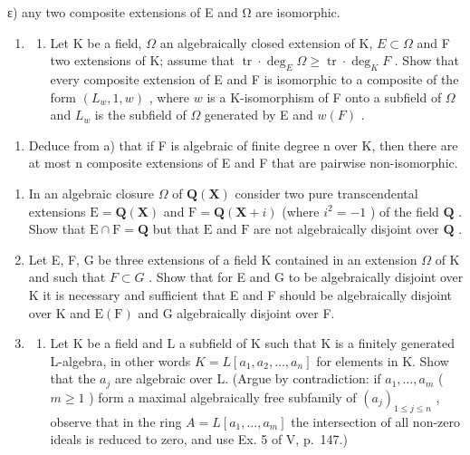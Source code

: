 ε) any two composite extensions of E and Ω are isomorphic.

\begin{enumerate}
\def\labelenumi{\arabic{enumi})}
\setcounter{enumi}{11}
\tightlist
\item
  \begin{enumerate}
  \def\labelenumii{\alph{enumii})}
  \tightlist
  \item
    Let K be a field, \(\Omega\) an algebraically closed extension of K, \(E \subset \Omega\) and F two extensions of K; assume that \(\operatorname{tr} \cdot \deg_E \Omega \geqslant \operatorname{tr} \cdot \deg_K F\) . Show that every composite extension of E and F is isomorphic to a composite of the form \((L_w, 1, w)\) , where \(w\) is a K-isomorphism of F onto a subfield of \(\Omega\) and \(L_w\) is the subfield of \(\Omega\) generated by E and \(w(F)\) .
  \end{enumerate}
\end{enumerate}

\begin{enumerate}
\def\labelenumi{\alph{enumi})}
\setcounter{enumi}{1}
\tightlist
\item
  Deduce from a) that if F is algebraic of finite degree n over K, then there are at most n composite extensions of E and F that are pairwise non-isomorphic.
\end{enumerate}

\begin{enumerate}
\def\labelenumi{\arabic{enumi})}
\setcounter{enumi}{12}
\item
  In an algebraic closure \(\Omega\) of \(\mathbf{Q}(\mathbf{X})\) consider two pure transcendental extensions \(\mathrm{E} = \mathbf{Q}(\mathbf{X})\) and \(\mathrm{F} = \mathbf{Q}(\mathbf{X} + i)\) (where \(i^2 = -1\) ) of the field \(\mathbf{Q}\) . Show that \(\mathrm{E} \cap \mathrm{F} = \mathbf{Q}\) but that \(\mathrm{E}\) and \(\mathrm{F}\) are not algebraically disjoint over \(\mathbf{Q}\) .
\item
  Let E, F, G be three extensions of a field K contained in an extension \(\Omega\) of K and such that \(F \subset G\) . Show that for E and G to be algebraically disjoint over K it is necessary and sufficient that E and F should be algebraically disjoint over K and \(\mathrm{E}(\mathrm{F})\) and G algebraically disjoint over F.
\item
  \begin{enumerate}
  \def\labelenumii{\alph{enumii})}
  \tightlist
  \item
    Let K be a field and L a subfield of K such that K is a finitely generated L-algebra, in other words \(K = L[a_{1}, a_{2}, \ldots, a_{n}]\) for elements in K. Show that the \(a_{j}\) are algebraic over L. (Argue by contradiction: if \(a_{1}, \ldots, a_{m}\) ( \(m \geqslant 1\) ) form a maximal algebraically free subfamily of \((a_{j})_{1 \leqslant j \leqslant n}\) , observe that in the ring \(A = L[a_{1}, \ldots, a_{m}]\) the intersection of all non-zero ideals is reduced to zero, and use Ex. 5 of V, p.~147.)
  \end{enumerate}
\end{enumerate}

